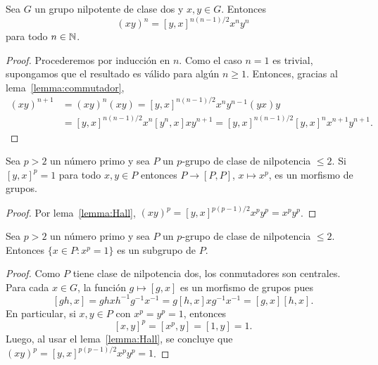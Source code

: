 \begin{lemma}[Hall]
	\label{lemma:Hall}
	Sea $G$ un grupo nilpotente de clase dos y $x,y\in G$. Entonces
	\[
		(xy)^n=[y,x]^{n(n-1)/2}x^ny^n
	\]
	para todo $n\in\mathbb{N}$.
\end{lemma}

\begin{proof}
	Procederemos por inducción en $n$. Como el caso $n=1$ es trivial,
	supongamos que el resultado es válido para algún $n\geq1$. Entonces,
	gracias al lema~\ref{lemma:commutador}, 
	\begin{align*}
		(xy)^{n+1} &= (xy)^n(xy)=[y,x]^{n(n-1)/2}x^ny^{n-1}(yx)y\\
		&=[y,x]^{n(n-1)/2}x^{n}[y^n,x]xy^{n+1}=[y,x]^{n(n-1)/2}[y,x]^nx^{n+1}y^{n+1}.
	\end{align*}
\end{proof}

\begin{lemma}
	\label{lemma:class2}
	Sea $p>2$ un número primo y sea 
	$P$ un $p$-grupo de clase de nilpotencia $\leq2$. 
	Si $[y,x]^p=1$ para todo $x,y\in P$ entonces $P\to [P,P]$,
	$x\mapsto x^p$, es un morfismo de grupos.
\end{lemma}

\begin{proof}
	Por lema~\ref{lemma:Hall},
	$(xy)^p=[y,x]^{p(p-1)/2}x^py^p=x^py^p$. 	
\end{proof}

\begin{theorem}
	\label{thm:class2}
	Sea $p>2$ un número primo y sea 
	$P$ un $p$-grupo de clase de nilpotencia $\leq2$. 
	Entonces $\{x\in P:x^p=1\}$ es un subgrupo de $P$.
\end{theorem}

\begin{proof}
	Como $P$ tiene clase de nilpotencia dos, los conmutadores son centrales.
	Para cada $x\in G$, la función $g\mapsto [g,x]$ es un morfismo de grupos
	pues
	\[
		[gh,x]=ghxh^{-1}g^{-1}x^{-1}=g[h,x]xg^{-1}x^{-1}=[g,x][h,x].
	\]
	En particular, si $x,y\in P$ con $x^p=y^p=1$, entonces
	\[
		[x,y]^p=[x^p,y]=[1,y]=1.
	\]
	Luego, al usar el lema~\ref{lemma:Hall}, se concluye que
	$(xy)^p=[y,x]^{p(p-1)/2}x^py^p=1$.
\end{proof}

